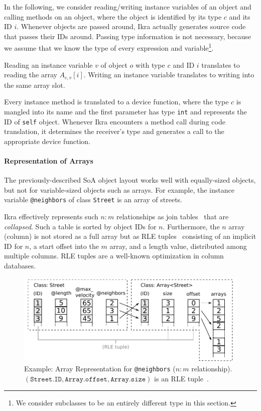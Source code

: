 \documentclass[preprint]{sigplanconf}
\begin{document}
In the following, we consider reading/writing instance variables of an object and calling methods on an object, where the object is identified by its type $c$ and its ID $i$. Whenever objects are passed around, Ikra actually generates source code that passes their IDs around. Passing type information is not necessary, because we assume that we know the type of every expression and variable\footnote{We consider subclasses to be an entirely different type in this section.}.

Reading an instance variable $v$ of object $o$ with type $c$ and ID $i$ translates to reading the array $A_{c,v}[i]$. Writing an instance variable translates to writing into the same array slot.

Every instance method is translated to a device function, where the type $c$ is mangled into its name and the first parameter has type \texttt{int} and represents the ID of \texttt{self} object. Whenever Ikra encounters a method call during code translation, it determines the receiver's type and generates a call to the appropriate device function.

\paragraph{Representation of Arrays}
The previously-described SoA object layout works well with equally-sized objects, but not for variable-sized objects such as arrays. For example, the instance variable \texttt{@neighbors} of class \texttt{Street} is an array of streets.

Ikra effectively represents such $n:m$ relationships as join tables~\cite{Garcia-Molina:2008:DSC:1450931} that are \emph{collapsed}. Such a table is sorted by object IDs for $n$. Furthermore, the $n$ array (column) is not stored as a full array but as RLE tuples~\cite{Abadi:2006:ICE:1142473.1142548} consisting of an implicit ID for $n$, a start offset into the $m$ array, and a length value, distributed among multiple columns. RLE tuples are a well-known optimization in column databases.

\begin{figure}[!htp]
    \centering
    \includegraphics[width=\columnwidth]{column_access.pdf}
    \caption{Example: Array Representation for \texttt{@neighbors} ($n:m$ relationship). $(\texttt{Street.ID}, \texttt{Array.offset}, \texttt{Array.size})$ is an RLE tuple~\cite{Abadi:2006:ICE:1142473.1142548}.}
    \label{fig:array_repr}
\end{figure}
\end{document}
